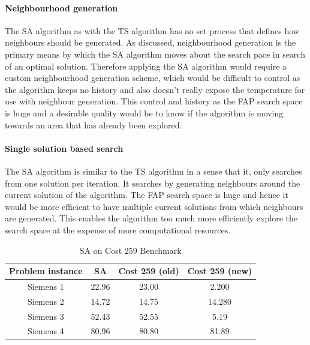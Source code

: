 \paragraph{Neighbourhood generation}
The SA algorithm as with the TS algorithm has no set process that defines how neighbours should be generated. As discussed, neighbourhood generation is the primary means by which the SA algorithm moves about the search pace in search of an optimal solution. Therefore applying the SA algorithm would require a custom neighbourhood generation scheme, which would be difficult to control as the algorithm keeps no history and also doesn't really expose the temperature for use with neighbour generation. This control and history as the FAP search space is huge and a desirable quality would be to know if the algorithm is moving towards an area that has already been explored.
\paragraph{Single solution based search}
The SA algorithm is similar to the TS algorithm in a sense that it, only searches from one solution per iteration. It searches by generating neighbours around the current solution of the algorithm. The FAP search space is huge and hence it would be more efficient to have multiple current solutions from which neighbours are generated. This enables the algorithm too much more efficiently explore the search space at the expense of more computational resources.
\begin{table}
\centering
	\begin{tabular}{| c | c | c | c |}
	\hline
	Problem instance & SA & Cost 259 (old) & Cost 259 (new) \\ \hline
	Siemens 1 & 22.96 & 23.00 & 2.200\\ \hline
	Siemens 2 & 14.72 & 14.75 & 14.280\\ \hline
	Siemens 3 & 52.43 & 52.55 & 5.19\\ \hline
	Siemens 4 & 80.96 & 80.80 & 81.89\\ \hline
	\end{tabular}
\caption{SA on Cost 259 Benchmark}
\end{table}

